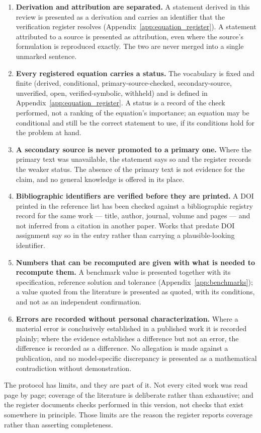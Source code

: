 \begin{enumerate}
\item \textbf{Derivation and attribution are separated.} A statement derived in this review is presented as a derivation and carries an identifier that the verification register resolves (Appendix~\ref{app:equation_register}). A statement attributed to a source is presented as attribution, even where the source's formulation is reproduced exactly. The two are never merged into a single unmarked sentence.
\item \textbf{Every registered equation carries a status.} The vocabulary is fixed and finite (derived, conditional, primary-source-checked, secondary-source, unverified, open, verified-symbolic, withheld) and is defined in Appendix~\ref{app:equation_register}. A status is a record of the check performed, not a ranking of the equation's importance; an equation may be conditional and still be the correct statement to use, if its conditions hold for the problem at hand.
\item \textbf{A secondary source is never promoted to a primary one.} Where the primary text was unavailable, the statement says so and the register records the weaker status. The absence of the primary text is not evidence for the claim, and no general knowledge is offered in its place.
\item \textbf{Bibliographic identifiers are verified before they are printed.} A DOI printed in the reference list has been checked against a bibliographic registry record for the same work --- title, author, journal, volume and pages --- and not inferred from a citation in another paper. Works that predate DOI assignment say so in the entry rather than carrying a plausible-looking identifier.
\item \textbf{Numbers that can be recomputed are given with what is needed to recompute them.} A benchmark value is presented together with its specification, reference solution and tolerance (Appendix~\ref{app:benchmarks}); a value quoted from the literature is presented as quoted, with its conditions, and not as an independent confirmation.
\item \textbf{Errors are recorded without personal characterization.} Where a material error is conclusively established in a published work it is recorded plainly; where the evidence establishes a difference but not an error, the difference is recorded as a difference. No allegation is made against a publication, and no model-specific discrepancy is presented as a mathematical contradiction without demonstration.
\end{enumerate}

The protocol has limits, and they are part of it. Not every cited work was read page by page; coverage of the literature is deliberate rather than exhaustive; and the register documents checks performed in this version, not checks that exist somewhere in principle. Those limits are the reason the register reports coverage rather than asserting completeness.

